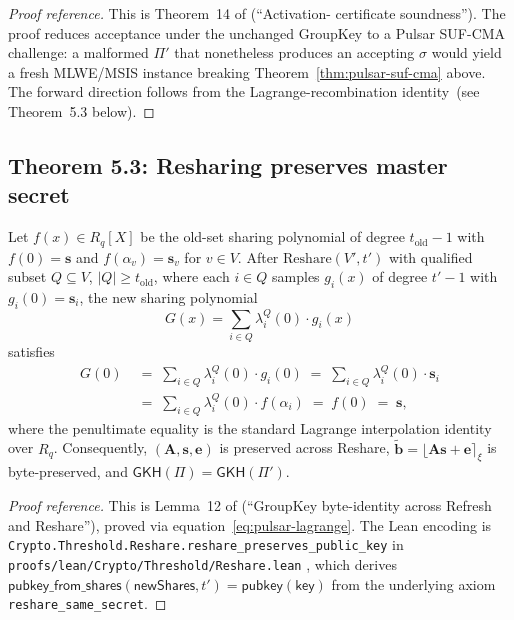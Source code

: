 \begin{proof}[Proof reference]
This is Theorem~14 of \cite{quasarcertsoundness} (``Activation-
certificate soundness''). The proof reduces acceptance under the
unchanged GroupKey to a Pulsar SUF-CMA challenge: a malformed
$\Pi'$ that nonetheless produces an accepting $\sigma$ would yield a
fresh MLWE/MSIS instance breaking Theorem~\ref{thm:pulsar-suf-cma}
above. The forward direction follows from the Lagrange-recombination
identity~(see Theorem~5.3 below).
\end{proof}

\subsection{Theorem 5.3: Resharing preserves master secret}
\label{sec:security:thm53}

\begin{theorem}
\label{thm:pulsar-reshare}
Let $f(x) \in R_q[X]$ be the old-set sharing polynomial of degree
$t_{\mathrm{old}} - 1$ with $f(0) = \mathbf{s}$ and
$f(\alpha_v) = \mathbf{s}_v$ for $v \in V$. After
$\mathrm{Reshare}(V', t')$ with qualified subset
$Q \subseteq V$, $|Q| \geq t_{\mathrm{old}}$, where each $i \in Q$
samples $g_i(x)$ of degree $t' - 1$ with $g_i(0) = \mathbf{s}_i$, the
new sharing polynomial
\[
  G(x) = \sum_{i \in Q} \lambda^Q_i(0) \cdot g_i(x)
\]
satisfies
\begin{align}
  G(0)
  \;&=\; \sum_{i \in Q} \lambda^Q_i(0) \cdot g_i(0)
  \;=\; \sum_{i \in Q} \lambda^Q_i(0) \cdot \mathbf{s}_i
  \nonumber \\
  \;&=\; \sum_{i \in Q} \lambda^Q_i(0) \cdot f(\alpha_i)
  \;=\; f(0)
  \;=\; \mathbf{s},
  \label{eq:pulsar-lagrange}
\end{align}
where the penultimate equality is the standard Lagrange interpolation
identity over $R_q$. Consequently,
$(\mathbf{A}, \mathbf{s}, \mathbf{e})$ is preserved across Reshare,
$\tilde{\mathbf{b}} = \lfloor \mathbf{A} \mathbf{s} +
\mathbf{e} \rceil_\xi$ is byte-preserved, and
$\mathsf{GKH}(\Pi) = \mathsf{GKH}(\Pi')$.
\end{theorem}

\begin{proof}[Proof reference]
This is Lemma~12 of \cite{quasarcertsoundness} (``GroupKey
byte-identity across Refresh and Reshare''), proved via
equation~\eqref{eq:pulsar-lagrange}. The Lean encoding is
\texttt{Crypto.Threshold.Reshare.reshare\_preserves\_public\_key} in
\texttt{proofs/lean/Crypto/Threshold/Reshare.lean} \cite{leancrypto},
which derives $\mathsf{pubkey\_from\_shares}(\mathsf{newShares}, t')
= \mathsf{pubkey}(\mathsf{key})$ from the underlying axiom
\texttt{reshare\_same\_secret}.
\end{proof}

